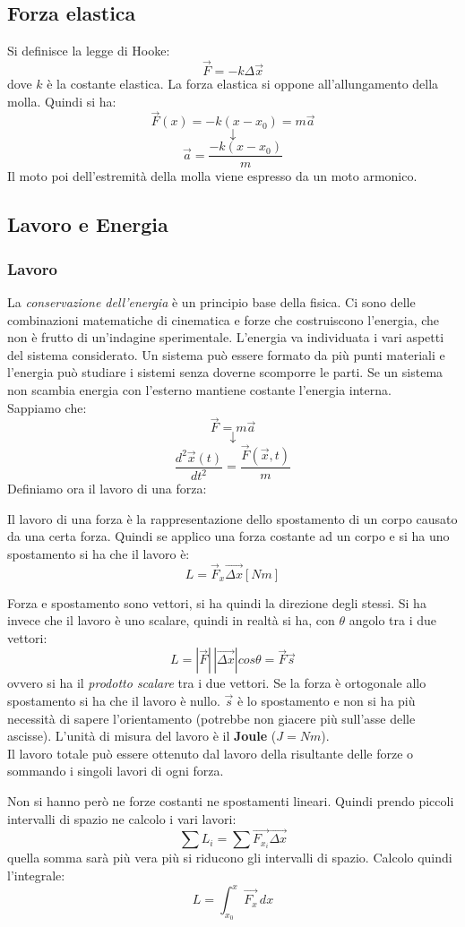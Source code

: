 \documentclass[a4paper,12pt, oneside]{book}
\begin{document}
\subsection{Forza elastica}
Si definisce la legge di Hooke:
$$\vec{F}=-k\Delta \vec{x}$$
dove $k$ è la costante elastica. La forza elastica si oppone all'allungamento della molla. Quindi si ha:
$$\vec{F}(x)=-k(x-x_0)=m\vec{a}$$
$$\downarrow$$
$$\vec{a}=\frac{-k(x-x_0)}{m}$$
Il moto poi dell'estremità della molla viene espresso da un moto armonico.
\subsection{Lavoro e Energia}
\subsubsection{Lavoro}
La \textit{conservazione dell'energia} è un principio base della fisica. Ci sono delle combinazioni matematiche di cinematica e forze che costruiscono l'energia, che non è frutto di un'indagine sperimentale. L'energia va individuata i vari aspetti del sistema considerato. Un sistema può essere formato da più punti materiali e l'energia può studiare i sistemi senza doverne scomporre le parti. Se un sistema non scambia energia con l'esterno mantiene costante l'energia interna.\\
Sappiamo che:
$$\vec{F}=m\vec{a}$$
$$\downarrow$$
$$\frac{d^2\vec{x}(t)}{dt^2}=\frac{\vec{F}(\vec{x},t)}{m}$$
Definiamo ora il lavoro di una forza:
\begin{definizione}
Il lavoro di una forza è la rappresentazione dello spostamento di un corpo causato da una certa forza. Quindi se applico una forza costante ad un corpo e si ha uno spostamento si ha che il lavoro è:
$$L=\vec{F}_x\vec{\Delta x}[Nm]$$

Forza e spostamento sono vettori, si ha quindi la direzione degli stessi. Si ha invece che il lavoro è uno scalare, quindi in realtà si ha, con $\theta$ angolo tra i due vettori:
$$L=|\vec{F}|\,|\vec{\Delta x}|cos\theta=\vec{F}\vec{s}$$
ovvero si ha il \textit{prodotto scalare} tra i due vettori. Se la forza è ortogonale allo spostamento si ha che il lavoro è nullo. $\vec{s}$ è lo spostamento e non si ha più necessità di sapere l'orientamento (potrebbe non giacere più sull'asse  delle ascisse). L'unità di misura del lavoro è il \textbf{Joule} ($J=Nm$). \\
Il lavoro totale può essere ottenuto dal lavoro della risultante delle forze o sommando i singoli lavori di ogni forza.
\end{definizione}
Non si hanno però ne forze costanti ne spostamenti lineari. Quindi prendo piccoli intervalli di spazio ne calcolo i vari lavori:
$$\sum	L_i= \sum \vec{F_{x_i}}\vec{\Delta x}$$
quella somma sarà più vera più si riducono gli intervalli di spazio. Calcolo quindi l'integrale:
$$L=\int_{x_0}^x \vec{F_x}\,dx$$
\end{document}
